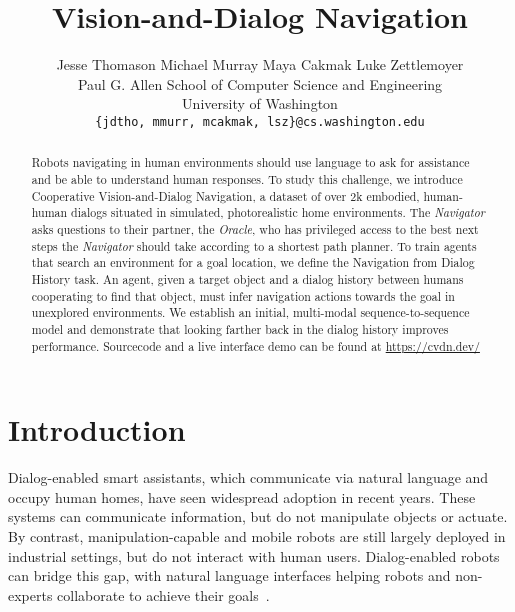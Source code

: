 \documentclass{article}
\title{Vision-and-Dialog Navigation}
\author{
  Jesse Thomason \qquad Michael Murray \qquad Maya Cakmak \qquad Luke Zettlemoyer \\
  Paul G. Allen School of Computer Science and Engineering \\
  University of Washington \\
  \texttt{\{jdtho, mmurr, mcakmak, lsz\}@cs.washington.edu}
}
\newcommand{\datasetfull}{Cooperative Vision-and-Dialog Navigation}
\newcommand{\taskfull}{Navigation from Dialog History}
\newcommand{\nav}{\textit{Navigator}}
\newcommand{\ora}{\textit{Oracle}}
\begin{document}
\maketitle



\begin{abstract}
Robots navigating in human environments should use language to ask for assistance and be able to understand human responses.
To study this challenge, we introduce \datasetfull{}, a dataset of over 2k embodied, human-human dialogs situated in simulated, photorealistic home environments.
The \nav{} asks questions to their partner, the \ora{}, who has privileged access to the best next steps the \nav{} should take according to a shortest path planner.
To train agents that search an environment for a goal location, we define the \taskfull{} task.
An agent, given a target object and a dialog history between humans cooperating to find that object, must infer navigation actions towards the goal in unexplored environments.
We establish an initial, multi-modal sequence-to-sequence model and demonstrate that looking farther back in the dialog history improves performance.
Sourcecode and a live interface demo can be found at \url{https://cvdn.dev/}
\end{abstract}



\section{Introduction}
\label{sec:introduction}
Dialog-enabled smart assistants, which communicate via natural language and occupy human homes, have seen widespread adoption in recent years.
These systems can communicate information, but do not manipulate objects or actuate.
By contrast, manipulation-capable and mobile robots are still largely deployed in industrial settings, but do not interact with human users.
Dialog-enabled robots can bridge this gap, with natural language interfaces helping robots and non-experts collaborate to achieve their goals~\cite{tellex:rss14,chai:ijcai18,thomason:icra19,murnane:siggraph19,williams:auro19}.
\end{document}
